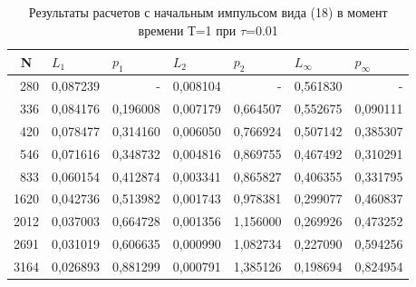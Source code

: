 \documentclass[14pt]{article}
\begin{document}
\begin{table}[H]
\caption{Результаты расчетов с начальным импульсом вида (18) в момент времени Т=1 при $\tau$=0.01}
\begin{tabular}{|r|r|r|r|r|r|r|}
\hline
\multicolumn{1}{|c|}{N} & \multicolumn{1}{l|}{$L_1$}        & \multicolumn{1}{l|}{$p_1$} & \multicolumn{1}{l|}{$L_2$}     & \multicolumn{1}{l|}{$p_2$} & \multicolumn{1}{l|}{$L_\infty$} & \multicolumn{1}{l|}{$p_\infty$} \\ \hline
280                     & 0,087239                         & -                         & 0,008104                      & -    & 0,561830                    & -                           \\ \hline
336                     & 0,084176                         & 0,196008                  & 0,007179                      & 0,664507                  & 0,552675                    & 0,090111                    \\ \hline
420                     & 0,078477                         & 0,314160                  & 0,006050                      & 0,766924                  & 0,507142                    & 0,385307                    \\ \hline
546                     & 0,071616                         & 0,348732                  & 0,004816                      & 0,869755                  & 0,467492                    & 0,310291                    \\ \hline
833                     & 0,060154                         & 0,412874                  & 0,003341                      & 0,865827                  & 0,406355                    & 0,331795                    \\ \hline
1620                    & 0,042736                         & 0,513982                  & 0,001743                      & 0,978381                  & 0,299077                    & 0,460837                    \\ \hline
2012                    & 0,037003                         & 0,664728                  & 0,001356                      & 1,156000                  & 0,269926                    & 0,473252                    \\ \hline
2691                    & 0,031019                         & 0,606635                  & 0,000990                      & 1,082734                  & 0,227090                    & 0,594256                    \\ \hline
3164                    & 0,026893                         & 0,881299                  & 0,000791                      & 1,385126                  & 0,198694                    & 0,824954                    \\ \hline

\end{tabular}
\end{table}
\end{document}
